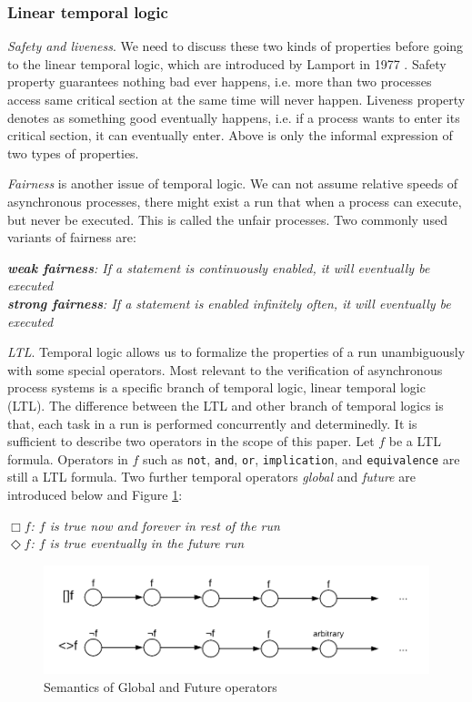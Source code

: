\subsubsection{Linear temporal logic}
\textit{Safety and liveness}. We need to discuss these two kinds of properties before going to the linear temporal logic, which are introduced by Lamport in 1977 \cite{Lamport:1977:PCM:1313313.1313439}. Safety property guarantees nothing bad ever happens, i.e. more than two processes access same critical section at the same time will never happen. Liveness property denotes as something good eventually happens, i.e. if a process wants to enter its critical section, it can eventually enter. Above is only the informal expression of two types of properties.

\textit{Fairness} is another issue of temporal logic. We can not assume relative speeds of asynchronous processes, there might exist a run that when a process can execute, but never be executed. This is called the unfair processes. Two commonly used variants of fairness are:

{\medbreak\indent\textit{\textbf{weak fairness}: If a statement is continuously enabled, it will eventually be executed}}
{\\\indent\textit{\textbf{strong fairness}: If a statement is enabled infinitely often, it will eventually be executed}}
\medbreak

\textit{LTL}. Temporal logic allows us to formalize the properties of a run unambiguously with some special operators. Most relevant to the verification of asynchronous process systems is a specific branch of temporal logic, linear temporal logic (LTL). The difference between the LTL and other branch of temporal logics is that, each task in a run is performed concurrently and determinedly. It is sufficient to describe two operators in the scope of this paper. Let $f$ be a LTL formula. Operators in $f$ such as \texttt{not}, \texttt{and}, \texttt{or}, \texttt{implication}, and \texttt{equivalence} are still a LTL formula. Two further temporal operators \textit{global} and \textit{future} are introduced below and Figure \ref{fig:ltl}:

{\medbreak\indent\textit{$\Box f$: $f$ is true now and forever in rest of the run}}
{\\\indent\textit{$\Diamond f$: $f$ is true eventually in the future run}}
\medbreak

\begin{figure}
\includegraphics[width=0.9\linewidth]{img/ltl}
\caption{Semantics of Global and Future operators}
\label{fig:ltl}
\end{figure}

